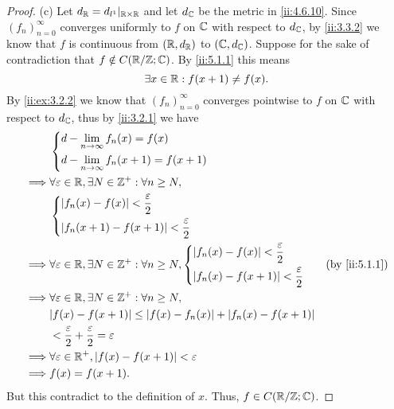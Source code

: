 \begin{proof}{(c)}
  Let \(d_{\mathbb{R}} = d_{l^1}|_{\mathbb{R} \times \mathbb{R}}\) and let \(d_{\mathbb{C}}\) be the metric in \cref{ii:4.6.10}.
  Since \((f_n)_{n = 0}^\infty\) converges uniformly to \(f\) on \(\mathbb{C}\) with respect to \(d_{\mathbb{C}}\), by \cref{ii:3.3.2} we know that \(f\) is continuous from \((\mathbb{R}, d_{\mathbb{R}})\) to \((\mathbb{C}, d_{\mathbb{C}})\).
  Suppose for the sake of contradiction that \(f \notin C(\mathbb{R} / \mathbb{Z} ; \mathbb{C})\).
  By \cref{ii:5.1.1} this means
  \[
    \exists x \in \mathbb{R} : f(x + 1) \neq f(x).
  \]
  By \cref{ii:ex:3.2.2} we know that \((f_n)_{n = 0}^\infty\) converges pointwise to \(f\) on \(\mathbb{C}\) with respect to \(d_{\mathbb{C}}\), thus by \cref{ii:3.2.1} we have
  \begin{align*}
             & \begin{dcases}
                 d - \lim_{n \to \infty} f_n(x) = f(x) \\
                 d - \lim_{n \to \infty} f_n(x + 1) = f(x + 1)
               \end{dcases}                                                                       \\
    \implies & \forall \varepsilon \in \R, \exists N \in \Z^+ : \forall n \geq N,                                                 \\
             & \begin{dcases}
                 \abs{f_n(x) - f(x)} < \dfrac{\varepsilon}{2} \\
                 \abs{f_n(x + 1) - f(x + 1)} < \dfrac{\varepsilon}{2}
               \end{dcases}                                                                \\
    \implies & \forall \varepsilon \in \R, \exists N \in \Z^+ : \forall n \geq N, \begin{dcases}
                                                                                    \abs{f_n(x) - f(x)} < \dfrac{\varepsilon}{2} \\
                                                                                    \abs{f_n(x) - f(x + 1)} < \dfrac{\varepsilon}{2}
                                                                                  \end{dcases} &  & \by{ii:5.1.1} \\
    \implies & \forall \varepsilon \in \R, \exists N \in \Z^+ : \forall n \geq N,                                                 \\
             & \abs{f(x) - f(x + 1)} \leq \abs{f(x) - f_n(x)} + \abs{f_n(x) - f(x + 1)}                                           \\
             & < \dfrac{\varepsilon}{2} + \dfrac{\varepsilon}{2} = \varepsilon                                                    \\
    \implies & \forall \varepsilon \in \R^+, \abs{f(x) - f(x + 1)} < \varepsilon                                                  \\
    \implies & f(x) = f(x + 1).
  \end{align*}
  But this contradict to the definition of \(x\).
  Thus, \(f \in C(\mathbb{R} / \mathbb{Z} ; \mathbb{C})\).
\end{proof}

